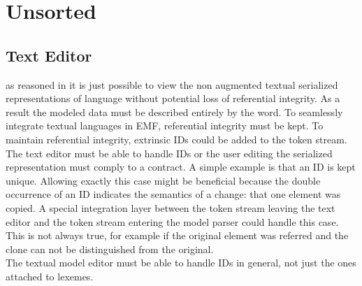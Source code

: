 \chapter{Unsorted}

\section{Text Editor}
as reasoned in  it is just possible to view the non augmented textual serialized representations of language without potential loss of referential integrity. As a result the modeled data must be described entirely by the word. To seamlessly integrate textual languages in EMF, referential integrity must be kept. To maintain referential integrity, extrinsic IDs could be added  to the token stream. The text editor must be able to handle IDs or the user editing the serialized representation must comply to a contract. A simple example is that an ID is kept unique. Allowing exactly this case might be beneficial because the double occurrence  of an ID indicates the semantics of a change: that one element was copied. A special integration layer between the token stream leaving the text editor and the token stream entering the model parser could handle this case. This is not always true, for example if the original element was referred and the clone can not be distinguished from the original. \\
The textual model editor must be able to handle IDs in general, not just the ones attached to lexemes. 





